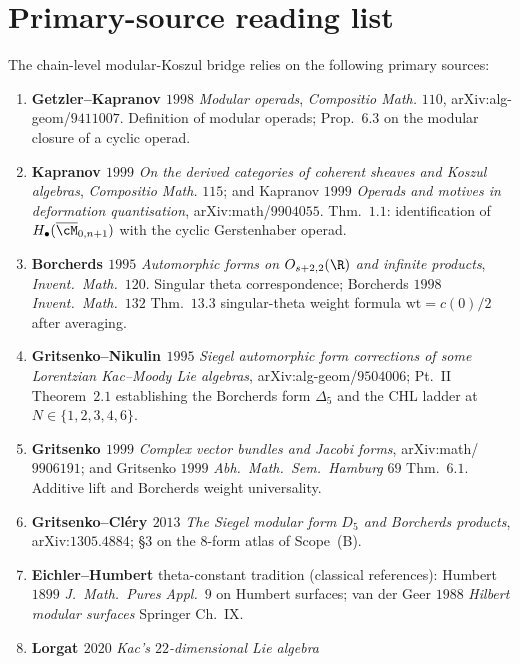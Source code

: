 
\section{Primary-source reading list}
\label{sec:primary-sources}

The chain-level modular-Koszul bridge relies on the following primary
sources:
\begin{enumerate}[label=\textup{(\arabic*)}]
\item \textbf{Getzler--Kapranov $1998$} \emph{Modular operads},
\emph{Compositio Math.} $110$, arXiv:alg-geom/$9411007$. Definition of
modular operads; Prop.~$6.3$ on the modular closure of a cyclic operad.
\item \textbf{Kapranov $1999$} \emph{On the derived categories of
coherent sheaves and Koszul algebras}, \emph{Compositio Math.} $115$;
and Kapranov $1999$ \emph{Operads and motives in deformation
quantisation}, arXiv:math/$9904055$. Thm.~$1.1$: identification of
$H_\bullet(\overline{\cM}_{0, n + 1})$ with the cyclic Gerstenhaber
operad.
\item \textbf{Borcherds $1995$} \emph{Automorphic forms on $O_{s + 2, 2}(\R)$
and infinite products}, \emph{Invent.~Math.}\ $120$. Singular theta
correspondence; Borcherds $1998$ \emph{Invent.~Math.}\ $132$ Thm.~$13.3$
singular-theta weight formula $\mathrm{wt} = c(0)/2$ after averaging.
\item \textbf{Gritsenko--Nikulin $1995$} \emph{Siegel automorphic form
corrections of some Lorentzian Kac--Moody Lie algebras},
arXiv:alg-geom/$9504006$; Pt.~II Theorem~$2.1$ establishing the Borcherds
form $\Delta_5$ and the CHL ladder at $N \in \{1, 2, 3, 4, 6\}$.
\item \textbf{Gritsenko $1999$} \emph{Complex vector bundles and Jacobi
forms}, arXiv:math/$9906191$; and Gritsenko $1999$ \emph{Abh.~Math.~Sem.~Hamburg}
$69$ Thm.~$6.1$. Additive lift and Borcherds weight universality.
\item \textbf{Gritsenko--Cl\'ery $2013$} \emph{The Siegel modular form
$D_5$ and Borcherds products}, arXiv:$1305.4884$; \S$3$ on the $8$-form
atlas of Scope~(B).
\item \textbf{Eichler--Humbert} theta-constant tradition (classical
references): Humbert $1899$ \emph{J.~Math.~Pures Appl.}\ $9$ on Humbert
surfaces; van der Geer $1988$ \emph{Hilbert modular surfaces} Springer
Ch.~IX.
\item \textbf{Lorgat $2020$} \emph{Kac's $22$-dimensional Lie algebra
}
\end{enumerate}
